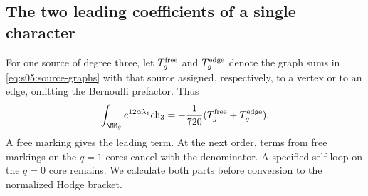 \subsection{The two leading coefficients of a single character}
\label{subsec:s05:02}

For one source of degree three, let $T_g^{\rm free}$ and
$T_g^{\rm edge}$ denote the graph sums in
\eqref{eq:s05:source-graphs} with that source assigned, respectively,
to a vertex or to an edge, omitting the Bernoulli prefactor. Thus
\begin{equation}\label{eq:s05:single-source}
 \int_{\MM_g}e^{12\alpha\lambda_1}\mathrm{ch}_3
       =-\frac1{720}(T_g^{\rm free}+T_g^{\rm edge}).
\end{equation}
A free marking gives the leading term. At the next order, terms
from free markings on the $q=1$ cores cancel with the denominator.
A specified self-loop on the $q=0$ core remains. We calculate both
parts before conversion to the normalized Hodge bracket.

